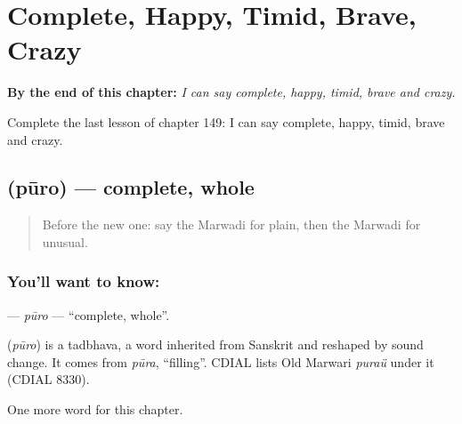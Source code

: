 
\chapter{Complete, Happy, Timid, Brave, Crazy}
\label{ch:mw-complete-happy-timid-brave-crazy}

\begin{chapteropening}
\textbf{By the end of this chapter:} \emph{I can say complete, happy, timid, brave and crazy.}

Complete the last lesson of chapter 149: I can say complete, happy, timid, brave and crazy.
\end{chapteropening}

\section[\texorpdfstring{\mw{पूरो} (pūro)}{पूरो (pūro)}]{ (pūro) — complete, whole}

\label{lesson:MW-C149-puro}



\begin{quote}
Before the new one: say the Marwadi for plain, then the Marwadi for unusual.
\end{quote}

\subsection*{You'll want to know: }
\textbf{} — \emph{pūro} — \textquotedblleft{}complete, whole\textquotedblright{}.

\begin{cousinweb}
\textbf{} (\emph{pūro}) is a tadbhava, a word inherited from Sanskrit and reshaped by sound change. It comes from \emph{pūra}, \textquotedblleft{}filling\textquotedblright{}. CDIAL lists Old Marwari \emph{puraü} under it (CDIAL 8330).
\end{cousinweb}

\begin{grammarlens}[title={What you've built}]
One more word for this chapter.
\end{grammarlens}

